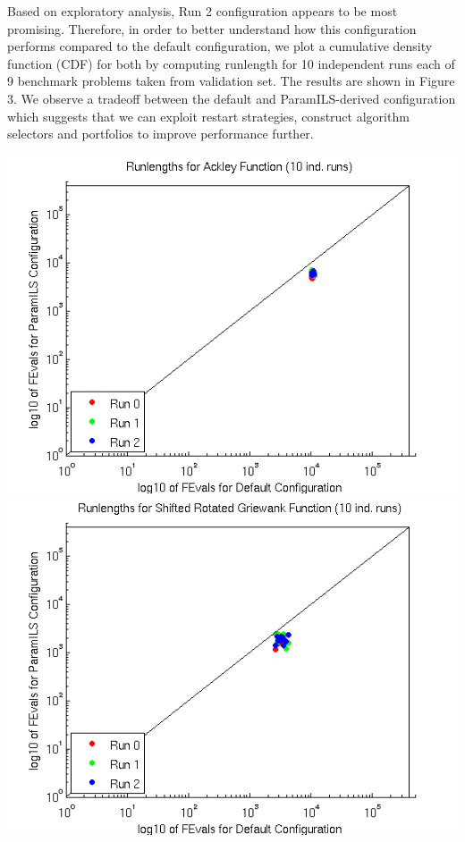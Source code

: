 Based on exploratory analysis, Run 2 configuration appears to be most promising. Therefore, in order to better understand how this configuration performs compared to the default configuration, we plot a cumulative density function (CDF) for both by computing runlength for 10 independent runs each of 9 benchmark problems taken from validation set. The results are shown in Figure 3. We observe a tradeoff between the default and ParamILS-derived configuration which suggests that we can exploit restart strategies, construct algorithm selectors and portfolios to improve performance further.\\

\begin{center}
\hfill \includegraphics[scale=0.45]{scatterAckley.png} \quad \includegraphics[scale=0.45]{scatterGriewank.png} \hfill \\

\end{center}
